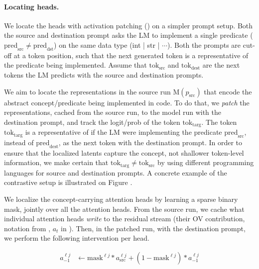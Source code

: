 \paragraph{Locating \goal heads.} 
We locate the \goal heads with activation patching () on a simpler prompt setup. Both the source and destination prompt asks the LM to implement a single predicate ($\mathrm{pred}_\mathrm{src} \neq \mathrm{pred}_\mathrm{dst}$) on the same data type (int | str | $\cdots$). Both the prompts are cut-off at a token position, such that the next generated token is a representative of the predicate being implemented. Assume that $\mathrm{tok}_\mathrm{src}$ and $\mathrm{tok}_\text{dest}$ are the next tokens the LM predicts with the source and destination prompts.

We aim to locate the representations in the source run $\mathrm{M}(p_\mathrm{src})$ that encode the abstract concept/predicate being implemented in code. To do that, we \emph{patch} the representations, cached from the source run, to the model run with the destination prompt, and track the logit/prob of the token $\mathrm{tok}_\mathrm{targ}$. The token $\mathrm{tok}_\mathrm{targ}$ is a representative of if the LM were implementing the predicate $\mathrm{pred}_\mathrm{src}$, instead of $\mathrm{pred}_\mathrm{dest}$, as the next token with the destination prompt. In order to ensure that the localized latents capture the concept, not shallower token-level information, we make certain that $\mathrm{tok}_\mathrm{targ} \neq \mathrm{tok}_\mathrm{src}$ by using different programming languages for source and destination prompts. A concrete example of the contrastive setup is illustrated on {\color{red} Figure }.

We localize the concept-carrying attention heads by learning a sparse binary mask, jointly over all the attention heads. From the source run, we cache what individual attention heads \emph{write} to the residual stream (their OV contribution,  notation from \cite{elhage2021mathematical}, $a_t$ in ). Then, in the patched run, with the destination prompt, we perform the following intervention per head. 

\vspace{-1.5em}
\begin{align}
    \label{eqn:opt-int}
    a^{\ell j}_{-1} & \leftarrow \mathrm{mask}^{\ell j} * a^{\ell j}_{\mathrm{src}} + (1 - \mathrm{mask}^{\ell j}) * a^{\ell j}_{\mathrm{-1}}
\end{align}
\vspace{-1.5em}

